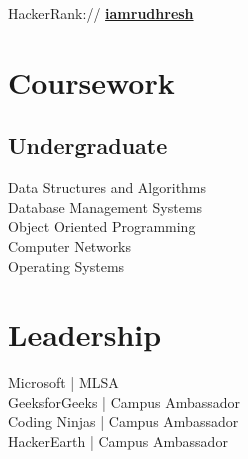\begin{minipage}[t]{0.33\textwidth}
HackerRank:// \href{https://www.hackerrank.com/iamrudhresh?hr_r=1}{\bf iamrudhresh} \\


\vspace{\topsep} %


\section{Coursework}
\subsection{Undergraduate}
\textbullet{} Data Structures and Algorithms \\
\textbullet{} Database Management Systems \\
\textbullet{} Object Oriented Programming \\
\textbullet{} Computer Networks \\
\textbullet{} Operating Systems \\
\sectionsep

\section{Leadership} 
\textbullet{} Microsoft | MLSA \\
\textbullet{} GeeksforGeeks | Campus Ambassador \\
\textbullet{} Coding Ninjas | Campus Ambassador \\
\textbullet{} HackerEarth | Campus Ambassador
\sectionsep

%
%

\end{minipage} 
\hfill
